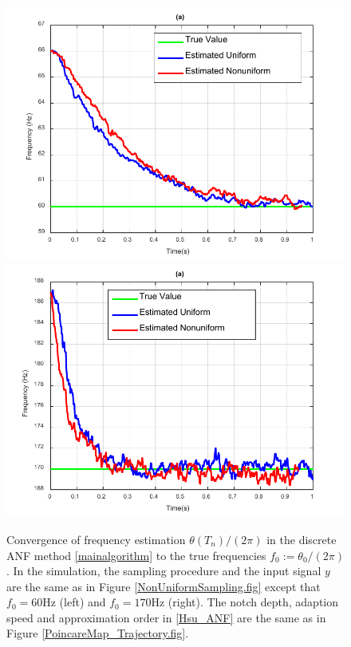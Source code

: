 \documentclass{UCF_ETD}
\begin{document}
\begin{figure}[H]
\begin{center}
\includegraphics[scale=0.8]{NonuniformANF/FreqConverUnifNonUnif60Pos} \includegraphics[scale=0.8]{NonuniformANF/FreqConverUnifNonUnif170Pos} 
\caption{Convergence of  frequency estimation $\theta(T_n)/(2\pi)$ in the discrete ANF method \eqref{mainalgorithm} to the true frequencies $f_0:=\theta_0/(2\pi)$.
 In the simulation, the sampling procedure
 and the input signal $y$ are the same as in Figure
 \ref{NonUniformSampling.fig} except that
    $f_0=60$Hz (left) and $f_0=170$Hz (right).
  The notch  depth, adaption speed  and approximation order in \eqref{Hsu_ANF} are the same as in
  Figure \ref{PoincareMap_Trajectory.fig}.}
\label{ConvergenceOf170.fig}
\end{center}
\end{figure}
\end{document}
